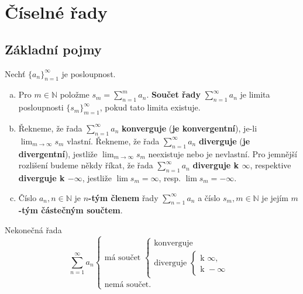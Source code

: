 \section{Číselné řady}
\subsection{Základní pojmy}
\begin{definice}
Nechť $\{a_n\}_{n=1}^\infty$ je posloupnost.
\begin{enumerate}[(a)]
\item Pro $m\in\mathbb{N}$ položme $s_m=\sum_{n=1}^m a_n$. \textbf{Součet řady} $\sum_{n=1}^\infty a_n$ je limita posloupnosti $\{s_m\}_{m=1}^\infty$, pokud tato limita existuje.
\item Řekneme, že řada $\sum_{n=1}^\infty a_n$ \textbf{konverguje} (\textbf{je konvergentní}), je-li $\lim_{m\to \infty} s_m$ vlastní.
Řekneme, že řada $\sum_{n=1}^\infty a_n$ \textbf{diverguje} (\textbf{je divergentní}), jestliže $\lim_{m\to \infty} s_m$ neexistuje nebo je nevlastní.
Pro jemnější rozlišení budeme někdy říkat, že řada $\sum_{n=1}^\infty a_n$ \textbf{diverguje k $\infty$}, respektive
\textbf{diverguje k $-\infty$}, jestliže $\lim s_m = \infty$, resp. $\lim s_m = -\infty$.
\item Číslo $a_n, n \in \mathbb N $ je \textbf{$n$-tým členem} řady $\sum_{n=1}^\infty a_n$
a číslo $s_m, m \in \mathbb N $ je jejím \textbf{$m$-tým částečným součtem}.
\end{enumerate}
\end{definice}

\begin{poznamka}
	Nekonečná řada
	$$
	\sum_{n=1}^\infty a_n \begin{cases}
	\textrm{má součet } \begin{cases}
		\textrm{konverguje}\\
		\textrm{diverguje } \begin{cases}
			\textrm{k } \infty,\\
			\textrm{k } -\infty
\end{cases}
\end{cases}	\\
\textrm{nemá součet}.
\end{cases}
	$$
\end{poznamka}

